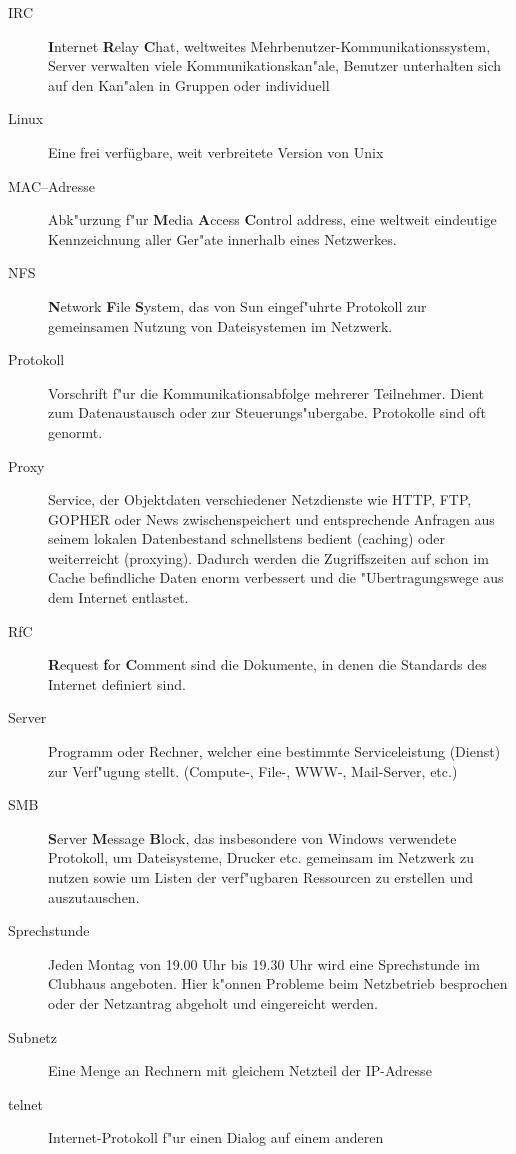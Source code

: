 \begin{description}
  \item[IRC] \textbf{I}nternet \textbf{R}elay \textbf{C}hat, weltweites
    Mehrbenutzer-Kommunikationssystem, Server verwalten viele
    Kommunikationskan"ale, Benutzer unterhalten sich auf den Kan"alen in
    Gruppen oder individuell
  \item[Linux] Eine frei verfügbare, weit verbreitete Version von \glossar Unix
  \item[MAC--Adresse] Abk"urzung f"ur \textbf{M}edia \textbf{A}ccess
    \textbf{C}ontrol address, eine weltweit eindeutige Kennzeichnung aller
    Ger"ate innerhalb eines Netzwerkes.
  \item[NFS] \textbf{N}etwork \textbf{F}ile \textbf{S}ystem, das von Sun
    eingef"uhrte Protokoll zur gemeinsamen Nutzung von Dateisystemen im
    Netzwerk.
  \item[Protokoll] Vorschrift f"ur die Kommunikationsabfolge mehrerer
    Teilnehmer. Dient zum Datenaustausch oder zur Steuerungs"ubergabe.
    Protokolle sind oft genormt.
  \item[Proxy] Service, der Objektdaten verschiedener Netzdienste wie HTTP,
    FTP, GOPHER oder News zwischenspeichert und entsprechende Anfragen aus
    seinem lokalen Datenbestand schnellstens bedient (caching) oder
    weiterreicht (proxying). Dadurch werden die Zugriffszeiten auf schon im
    Cache befindliche Daten enorm verbessert und die "Ubertragungswege aus dem
    Internet entlastet.
  \item[RfC] \textbf{R}equest \textbf{f}or \textbf{C}omment sind die
    Dokumente, in denen die Standards des Internet definiert sind.
  \item[Server] Programm oder Rechner, welcher eine bestimmte Serviceleistung
    (Dienst) zur Verf"ugung stellt. (Compute-, File-, WWW-, Mail-Server, etc.)
  \item[SMB] \textbf{S}erver \textbf{M}essage \textbf{B}lock, das insbesondere
    von Windows verwendete Protokoll, um Dateisysteme, Drucker etc. gemeinsam
    im Netzwerk zu nutzen sowie um Listen der verf"ugbaren Ressourcen zu
    erstellen und auszutauschen.
  \item[Sprechstunde] Jeden Montag von 19.00 Uhr bis 19.30 Uhr
   wird eine Sprechstunde im Clubhaus
    angeboten. Hier k"onnen Probleme beim Netzbetrieb besprochen oder
    der Netzantrag abgeholt und eingereicht werden.  
  \item[Subnetz] Eine Menge an Rechnern mit gleichem Netzteil der IP-Adresse
  \item[telnet] Internet-Protokoll f"ur einen Dialog auf einem anderen

\end{description}
